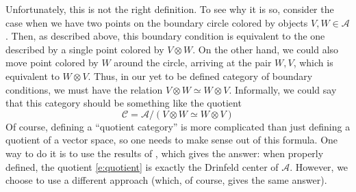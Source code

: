 \documentclass{amsart}
\theoremstyle{definition}
\theoremstyle{remark}
\numberwithin{equation}{section}
\newcommand{\<}{\langle}
\renewcommand{\>}{\rangle}
\newcommand{\C}{\mathcal{C}}      %
\newcommand{\A}{\mathcal{A}}      %
\begin{document}
Unfortunately, this is not the right definition. To see why it is so,
consider the case when we have two  points on the boundary circle colored
by objects $V, W\in \A$. Then, as described above,  
this boundary condition is equivalent to the one described by a single
point colored by $V\otimes W$. On the other hand, we could also move point
colored by $W$ around the circle,  arriving at the  pair $W,V$, which is
equivalent to $W\otimes V$. Thus, in our yet to be defined category of
boundary conditions, we must have the relation $V\otimes W\simeq  
W\otimes V$. Informally, we could say that  
this category should be something like the quotient 
\begin{equation}\label{e:quotient}
  \C=\A/(V\otimes W\simeq W\otimes V)
\end{equation}
Of course, defining a ``quotient category'' is more complicated than just 
defining a quotient of a vector space, so one needs to make sense out of 
this formula. One way to do it is to use the 
results of , which gives the answer: when properly 
defined, the quotient \eqref{e:quotient} is exactly the Drinfeld center of 
$\A$. However, we choose to use a different approach (which, of course, 
gives the same answer).
\end{document}
